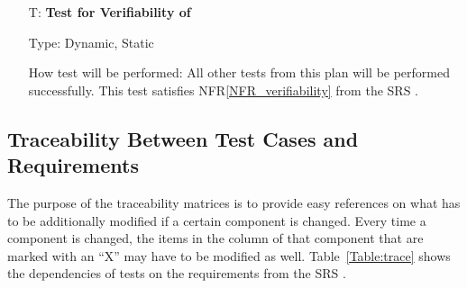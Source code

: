 \documentclass[12pt, titlepage]{article}
\newcounter{testnum} %
\newcommand{\nfrref}[1]{NFR\ref{#1}}
\begin{document}
\begin{enumerate}

  \item[T\refstepcounter{testnum}\thetestnum \label{test_verifiable}:]
    \textbf{Test for Verifiability of \progname{}}

    Type: Dynamic, Static

    How test will be performed: All other tests from this plan will be
    performed successfully. This test satisfies \nfrref{NFR_verifiability}
    from the SRS \cite{srs}.

\end{enumerate}

\begin{landscape}

  \subsection{Traceability Between Test Cases and Requirements} \label{sec_test_req_trace}

  The purpose of the traceability matrices is to provide easy references on what
  has to be additionally modified if a certain component is changed.  Every time a
  component is changed, the items in the column of that component that are marked
  with an ``X'' may have to be modified as well. Table~\ref{Table:trace} shows the
  dependencies of tests on the requirements from the SRS \cite{srs}.


\end{landscape}
\end{document}
